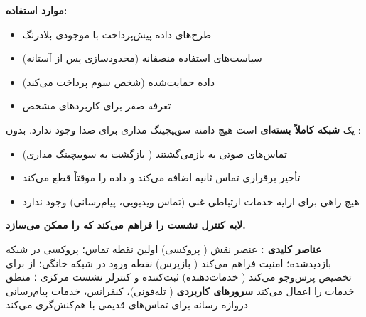 \textbf{موارد استفاده:}

\begin{itemize}
\tightlist
\item
  طرح‌های داده پیش‌پرداخت با موجودی بلادرنگ
\item
  سیاست‌های استفاده منصفانه (محدودسازی پس از آستانه)
\item
  داده حمایت‌شده (شخص سوم پرداخت می‌کند)
\item
  تعرفه صفر برای کاربردهای مشخص
\end{itemize}



\CNchained{}

 یک \textbf{شبکه کاملاً بسته‌ای} است  هیچ دامنه سوییچینگ مداری برای صدا وجود ندارد. بدون :

\begin{itemize}
\tightlist
\item
  تماس‌های صوتی به  بازمی‌گشتند (  بازگشت به سوییچینگ مداری)
\item
   تأخیر برقراری تماس  ثانیه اضافه می‌کند و داده  را موقتاً قطع می‌کند
\item
  هیچ راهی برای ارایه خدمات ارتباطی غنی (تماس ویدیویی، پیام‌رسانی) وجود ندارد
\end{itemize}

\textbf{ لایه کنترل نشست را فراهم می‌کند که  را ممکن می‌سازد.}




\textbf{عناصر کلیدی :}\CNbr{}\lr{\textbar{}} عنصر \lr{\textbar{}} نقش \lr{\textbar{}}\CNbr{}\CNbr{}\lr{\textbar{}}  ( پروکسی) \lr{\textbar{}} اولین نقطه تماس؛ پروکسی  در شبکه بازدیدشده؛ امنیت  فراهم می‌کند \lr{\textbar{}}\CNbr{}\lr{\textbar{}}  ( بازپرس) \lr{\textbar{}} نقطه ورود در شبکه خانگی؛ از  برای تخصیص  پرس‌وجو می‌کند \lr{\textbar{}}\CNbr{}\lr{\textbar{}}  ( خدمات‌دهنده) \lr{\textbar{}} ثبت‌کننده و کنترلر نشست مرکزی ؛ منطق خدمات را اعمال می‌کند \lr{\textbar{}}\CNbr{}\lr{\textbar{}} \textbf{سرورهای کاربردی} \lr{\textbar{}}  ( تله‌فونی)، کنفرانس، خدمات پیام‌رسانی \lr{\textbar{}}\CNbr{} دروازه رسانه  برای تماس‌های قدیمی با  هم‌کنش‌گری می‌کند \lr{\textbar{}}

